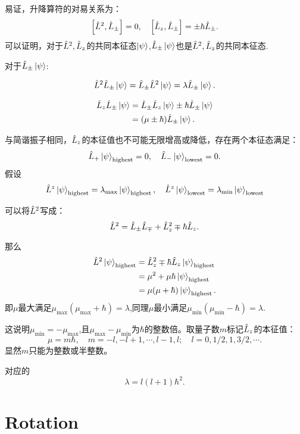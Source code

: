 易证，升降算符的对易关系为：
\begin{equation}
    \left[\hat{L}^2,\hat{L}_\pm\right]=0, \quad \left[\hat{L}_z,\hat{L}_\pm\right]=\pm\hbar\hat{L}_\pm.
\end{equation}
可以证明，对于$\hat{L}^2,\hat{L}_z$的共同本征态$\left|\psi\right>$,$\hat{L}_\pm\left|\psi\right>$也是$\hat{L}^2,\hat{L}_z$的共同本征态.

\begin{graybox}[Proof]
    对于$\hat{L}_\pm\left|\psi\right>$:

    \begin{equation}
        \begin{aligned}
            \hat{L}^2\hat{L}_\pm\left|\psi\right>=\hat{L}_\pm\hat{L}^2\left|\psi\right>=\lambda\hat{L}_\pm\left|\psi\right>.
        \end{aligned}
    \end{equation}

    \begin{equation}
        \begin{aligned}
            \hat{L}_z\hat{L}_\pm\left|\psi\right>&=\hat{L}_\pm\hat{L}_z\left|\psi\right>\pm\hbar\hat{L}_\pm\left|\psi\right>\\
            &=(\mu\pm\hbar)\hat{L}_\pm\left|\psi\right>.
        \end{aligned}
    \end{equation}
\end{graybox}

与简谐振子相同，$\hat{L}_z$的本征值也不可能无限增高或降低，存在两个本征态满足：
\begin{equation}
    \hat{L}_+\left|\psi\right>_\text{highest}=0,\quad \hat{L}_-\left|\psi\right>_\text{lowest}=0.
\end{equation}
假设$$\hat{L}^z\left|\psi\right>_\text{highest} =\lambda_{\text{max}}\left|\psi\right>_\text{highest},\quad \hat{L}^z\left|\psi\right>_\text{lowest} =\lambda_{\text{min}}\left|\psi\right>_\text{lowest}$$

可以将$\hat{L}^2$写成：
\begin{equation}
    \hat{L}^2=\hat{L}_\pm\hat{L}_\mp+\hat{L}_z^2\mp\hbar\hat{L}_z.
\end{equation}

那么
\begin{equation}
    \begin{aligned}
        \hat{L}^2\left|\psi\right>_\text{highest}&=\hat{L}_z^2\mp\hbar\hat{L}_z\left|\psi\right>_\text{highest}\\
        &=\mu^2+\mu\hbar\left|\psi\right>_\text{highest}\\
        &=\mu(\mu+\hbar)\left|\psi\right>_\text{highest}.
    \end{aligned}
\end{equation}
即$\mu$最大满足$\mu_\max(\mu_\max+\hbar)=\lambda$,同理$\mu$最小满足$\mu_\min(\mu_\min-\hbar)=\lambda$.

这说明$\mu_\min=-\mu_\max$,且$\mu_\max-\mu_\min$为$\hbar$的整数倍。取量子数$m$标记$\hat{L}_z$的本征值：
\begin{equation}
    \mu=m\hbar,\quad m=-l,-l+1,\cdots,l-1,l;\quad l=0,1/2,1,3/2,\cdots.
\end{equation}
显然$m$只能为整数或半整数。

对应的\begin{equation}
    \lambda=l(l+1)\hbar^2.
\end{equation}

\section{Rotation}



